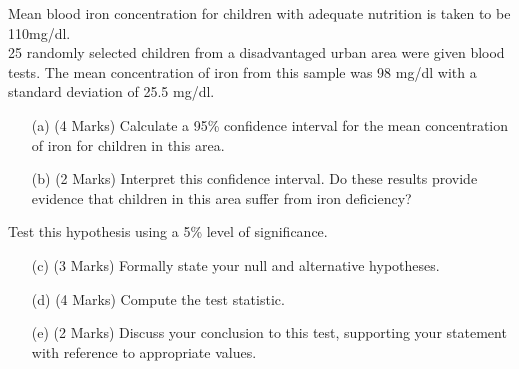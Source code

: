 \item Mean blood iron concentration for children with adequate nutrition is taken to be 110mg/dl. \\ 25 randomly selected children from a disadvantaged urban area were given blood tests. The mean concentration of iron from this sample was 98 mg/dl with a standard deviation of 25.5 mg/dl.
\begin{itemize}
	\item[(a)] (4 Marks) Calculate a 95\% confidence interval for the mean concentration of iron for children in this area. 
	\item[(b)](2 Marks) Interpret this confidence interval.  Do these results provide evidence that children in this area suffer from iron deficiency? 
\end{itemize}
\medskip
Test this hypothesis using a 5\% level of significance. 

\begin{itemize}
	\item[(c)](3 Marks) Formally state your null and alternative hypotheses.
	\item[(d)](4 Marks) Compute the test statistic.
	\item[(e)](2 Marks) Discuss your conclusion to this test, supporting your statement with reference to appropriate values.
\end{itemize}

